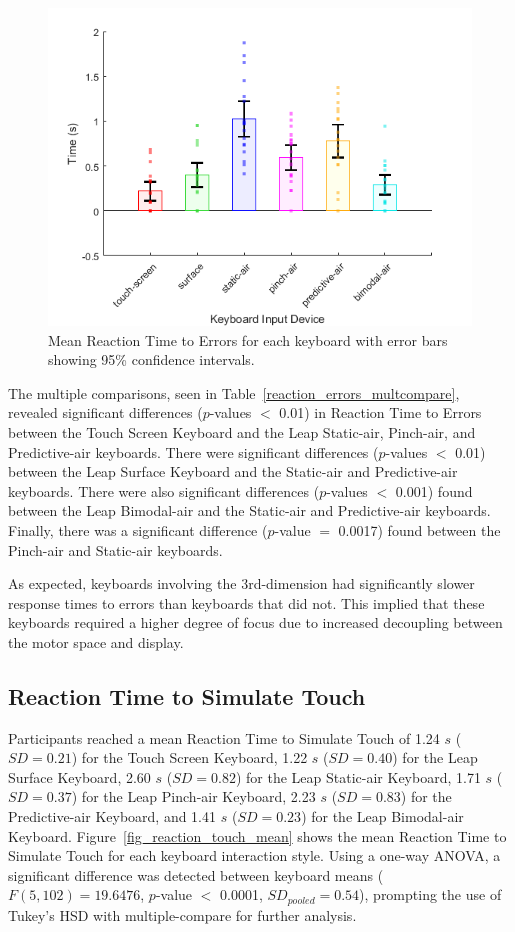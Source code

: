 \begin{figure}[!t]
	\centering
	\includegraphics{Figures/fig_reaction_errors_mean}
	\caption[Mean Reaction Time to Errors]{Mean Reaction Time to Errors for each keyboard with error bars showing 95\% confidence intervals.}
	\label{fig_reaction_errors_mean}
\end{figure}

The multiple comparisons, seen in Table~\ref{reaction_errors_multcompare}, revealed significant differences ($p$-values $<$ 0.01) in Reaction Time to Errors between the Touch Screen Keyboard and the Leap Static-air, Pinch-air, and Predictive-air keyboards. There were significant differences ($p$-values $<$ 0.01) between the Leap Surface Keyboard and the Static-air and Predictive-air keyboards. There were also significant differences ($p$-values $<$ 0.001) found between the Leap Bimodal-air and the Static-air and Predictive-air keyboards. Finally, there was a significant difference ($p$-value $=$ 0.0017) found between the Pinch-air and Static-air keyboards.

As expected, keyboards involving the 3rd-dimension had significantly slower response times to errors than keyboards that did not. This implied that these keyboards required a higher degree of focus due to increased decoupling between the motor space and display.

\subsection{Reaction Time to Simulate Touch}
Participants reached a mean Reaction Time to Simulate Touch of 1.24 $s$ ($SD = 0.21$) for the Touch Screen Keyboard, 1.22 $s$ ($SD = 0.40$) for the Leap Surface Keyboard, 2.60 $s$ ($SD = 0.82$) for the Leap Static-air Keyboard, 1.71 $s$ ($SD = 0.37$) for the Leap Pinch-air Keyboard, 2.23 $s$ ($SD = 0.83$) for the Predictive-air Keyboard, and 1.41 $s$ ($SD = 0.23$) for the Leap Bimodal-air Keyboard. Figure~\ref{fig_reaction_touch_mean} shows the mean Reaction Time to Simulate Touch for each keyboard interaction style. Using a one-way ANOVA, a significant difference was detected between keyboard means ($F(5, 102) = 19.6476$, $p$-value $<$ 0.0001, $SD_{pooled} = 0.54$), prompting the use of Tukey's HSD with multiple-compare for further analysis.

